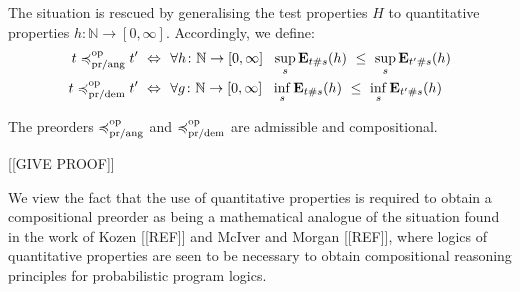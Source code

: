 The situation is rescued by generalising the test properties $H$ to 
quantitative properties $h \colon \mathbb{N} \to [0,\infty]$. 
Accordingly, we define:
\begin{align*}
t \preccurlyeq^{\text{op}}_{\text{pr/ang}} t' ~ \Leftrightarrow ~ ~& \forall h \colon \mathbb{N} \to [0,\infty]~~ \sup_s  \mathbf{E}_{t\#s} (h)~ \leq~ \sup_s \mathbf{E}_{t'\#s} (h)
\\
t \preccurlyeq^{\text{op}}_{\text{pr/dem}} t' ~ \Leftrightarrow ~ ~& \forall g \colon \mathbb{N} \to [0,\infty]~~ \inf_s  \mathbf{E}_{t\#s} (h)~ \leq~ \inf_s \mathbf{E}_{t'\#s} (h)
\end{align*}
\begin{proposition}
The preorders $\preccurlyeq^{\text{op}}_{\text{pr/ang}}$ and $\preccurlyeq^{\text{op}}_{\text{pr/dem}}$ are admissible and compositional.
\end{proposition}

[[GIVE PROOF]]

We view the fact that the use of quantitative properties is required to obtain a compositional preorder as being
a mathematical analogue of the situation found in the work of Kozen [[REF]] and McIver and Morgan [[REF]], where 
logics of quantitative properties are seen to be necessary to obtain compositional reasoning principles for 
probabilistic program logics.
